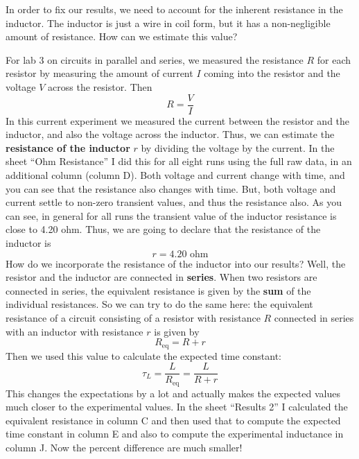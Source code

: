 In order to fix our results, we need to account for the inherent resistance in the inductor. The inductor is just a wire in coil form, but it has a non-negligible amount of resistance. How can we estimate this value?

For lab 3 on circuits in parallel and series, we measured the resistance $R$ for each resistor by measuring the amount of current $I$ coming into the resistor and the voltage $V$ across the resistor. Then
\begin{equation}
	R = \frac{V}{I}
\end{equation}
In this current experiment we measured the current between the resistor and the inductor, and also the voltage across the inductor. Thus, we can estimate the \textbf{resistance of the inductor} $r$ by dividing the voltage by the current. In the sheet ``Ohm Resistance'' I did this for all eight runs using the full raw data, in an additional column (column D). Both voltage and current change with time, and you can see that the resistance also changes with time. But, both voltage and current settle to non-zero transient values, and thus the resistance also. As you can see, in general for all runs the transient value of the inductor resistance is close to 4.20 ohm. Thus, we are going to declare that the resistance of the inductor is
\begin{equation}
	r = 4.20 \text{ ohm}
\end{equation}
How do we incorporate the resistance of the inductor into our results? Well, the resistor and the inductor are connected in \textbf{series}. When two resistors are connected in series, the equivalent resistance is given by the \textbf{sum} of the individual resistances. So we can try to do the same here: the equivalent resistance of a circuit consisting of a resistor with resistance $R$ connected in series with an inductor with resistance $r$ is given by
\begin{equation}
	R_{\text{eq}} = R + r
\end{equation}
Then we used this value to calculate the expected time constant:
\begin{equation}
	\tau_{L} = \frac{L}{R_{\text{eq}}} = \frac{L}{R + r}
\end{equation}
This changes the expectations by a lot and actually makes the expected values much closer to the experimental values. In the sheet ``Results 2'' I calculated the equivalent resistance in column C and then used that to compute the expected time constant in column E and also to compute the experimental inductance in column J. Now the percent difference are much smaller!


